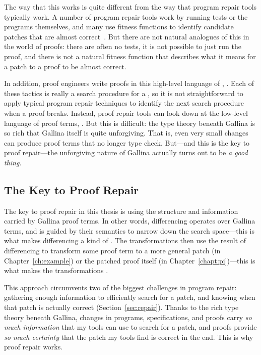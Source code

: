 The way that this works is quite different from the way that program repair tools typically work.
A number of program repair tools work by running tests or the programs themselves,
and many use fitness functions to identify candidate patches that 
are almost correct~\cite{Monperrus:2018:ASR:3177787.3105906}. %
But there are not natural analogues of this in the world of proofs:
there are often no tests, it is not possible to just run the proof, and there is not a natural 
fitness function that describes what it means for a patch to a proof to be almost correct.

In addition, proof engineers write proofs in this high-level language of , .
Each of these tactics is really a search procedure for a , so it is not straightforward to apply
typical program repair techniques to identify the next search procedure when a proof breaks.
Instead, proof repair tools can look down at the low-level language of proof terms, .
But this is difficult: the type theory  beneath Gallina is so rich that Gallina itself is quite unforgiving.
That is, even very small changes can produce proof terms that no longer type check.
But---and this is the key to proof repair---the unforgiving nature of Gallina actually turns out to be \textit{a good thing}.

\subsection{The Key to Proof Repair}
\label{sec:infocert}

The key to proof repair in this thesis is using the structure and information carried by Gallina proof terms.
In other words, differencing operates over Gallina terms,
and is guided by their semantics to narrow down the search space---this is what
makes differencing a kind of .
The transformations then use the result of differencing to transform some proof term to a more general patch (in Chapter~\ref{ch:example})
or the patched proof itself (in Chapter~\ref{chapt:pi})---this is what
makes the transformations .

This approach circumvents two of the biggest challenges in program repair:
gathering enough information to efficiently search for a patch,
and knowing when that patch is actually correct (Section~\ref{sec:repair}).
Thanks to the rich type theory beneath Gallina, changes in programs, specifications, and proofs
carry \textit{so much information} that my tools can use to search for a patch,
and proofs provide \textit{so much certainty} that the patch my tools find is correct in the end.
This is why proof repair works.

